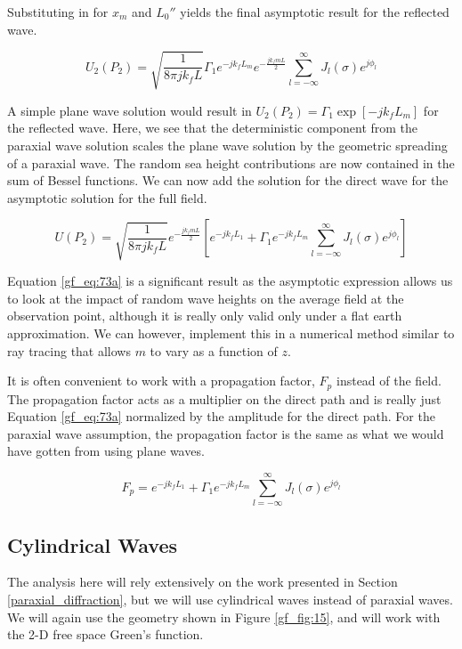 \noindent Substituting in for $x_m$ and $L_0''$ yields the final asymptotic result for the reflected wave.

\begin{equation}
U_2(P_2) = \sqrt{\frac{1}{8\pi jk_f L}}\Gamma_1e^{-jk_fL_m} e^{-\frac{jk_fmL}{2}} \sum_{l=-\infty}^{\infty}J_l(\sigma)e^{j\phi_l}
\label{gf_eq:73}
\end{equation}
\renewcommand{\baselinestretch}{2} \small\normalsize

A simple plane wave solution would result in $U_2(P_2) = \Gamma_1\exp[-jk_fL_m]$ for the reflected wave. Here, we see that the deterministic component from the paraxial wave  solution scales the plane wave solution by the geometric spreading of a paraxial wave. The random sea height contributions are now contained in the sum of Bessel functions. We can now add the solution for the direct wave for the asymptotic solution for the full field.

\begin{equation}
\boxed{U(P_2) = \sqrt{\frac{1}{8\pi jk_f L}}e^{-\frac{jk_fmL}{2}} \left[e^{-jk_fL_1}+\Gamma_1e^{-jk_fL_m} \sum_{l=-\infty}^{\infty}J_l(\sigma)e^{j\phi_l}\right]}
\label{gf_eq:73a}
\end{equation}
\renewcommand{\baselinestretch}{2} \small\normalsize

Equation \ref{gf_eq:73a} is a significant result as the asymptotic expression allows us to look at the impact of random wave heights on the average field at the observation point, although it is really only valid only under a flat earth approximation. We can however, implement this in a numerical method similar to ray tracing that allows $m$ to vary as a function of $z$.

It is often convenient to work with a propagation factor, $F_p$ instead of the field. The propagation factor acts as a multiplier on the direct path and is really just Equation \ref{gf_eq:73a} normalized by the amplitude for the direct path. For the paraxial wave assumption, the propagation factor is the same as what we would have gotten from using plane waves.

\begin{equation}
F_p = e^{-jk_fL_1}+\Gamma_1e^{-jk_fL_m} \sum_{l=-\infty}^{\infty}J_l(\sigma)e^{j\phi_l}
\label{gf_eq:73ab}
\end{equation}
\renewcommand{\baselinestretch}{2} \small\normalsize

\subsection{Cylindrical Waves}\label{cylindrical_diffraction}
The analysis here will rely extensively on the work presented in Section \ref{paraxial_diffraction}, but we will use cylindrical waves instead of paraxial waves. We will again use the geometry shown in Figure \ref{gf_fig:15}, and will work with the 2-D free space Green's function.

